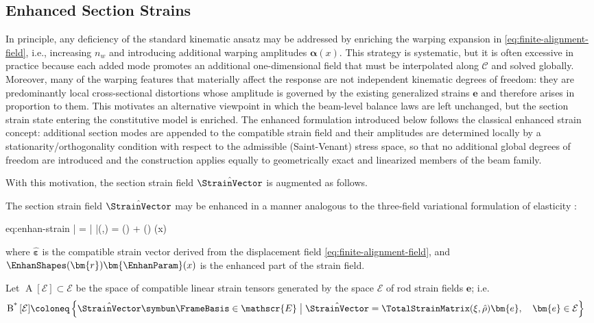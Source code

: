 
\subsection{Enhanced Section Strains}\label{sec:enhan-section}
In principle, any deficiency of the standard kinematic ansatz may be addressed by enriching the warping expansion in \eqref{eq:finite-alignment-field}, i.e., increasing $n_w$ and introducing additional warping amplitudes $\bm{\alpha}(x)$. This strategy is systematic, but it is often excessive in practice because each added mode promotes an additional one-dimensional field that must be interpolated along $\mathcal{C}$ and solved globally. 
Moreover, many of the warping features that materially affect the response are not independent kinematic degrees of freedom: they are predominantly local cross-sectional distortions whose amplitude is governed by the existing generalized strains $\bm{e}$ and therefore arises in proportion to them. 
This motivates an alternative viewpoint in which the beam-level balance laws are left unchanged, but the section strain state entering the constitutive model is enriched. The enhanced formulation introduced below follows the classical enhanced strain concept: additional section modes are appended to the compatible strain field and their amplitudes are determined locally by a stationarity/orthogonality condition with respect to the admissible (Saint-Venant) stress space, so that no additional global degrees of freedom are introduced and the construction applies equally to geometrically exact and linearized members of the beam family.

With this motivation, the section strain field $\hat{\StrainVector}$ is augmented as follows.


The section strain field \(\hat{\StrainVector}\) may be enhanced in a manner analogous to the three-field variational formulation of elasticity \citep{simo1986variational,simo1990class,simo1992geometrically}:
\begin{SaveEquation}{eq:enhan-strain}
\bar{} = \bar{\bm{\varepsilon}}\symbun\FrameBasis
\qquad{}\qquad
\bar{\StrainVector}(,) =  \hat{\StrainVector}() + \EnhanShapes() \bm{\EnhanParam}(x)
\end{SaveEquation}
where \(\hat{\bm{\varepsilon}}\) is the compatible strain vector derived from the displacement field \eqref{eq:finite-alignment-field}, and $\EnhanShapes(\bm{r}) \bm{\EnhanParam}(x)$ is the enhanced part of the strain field. 

Let $\operatorname{A}\left[\mathcal{E}\right] \subset \mathscr{E}$ be the space of compatible linear strain tensors generated by the space $\mathcal{E}$ of rod strain fields \(\bm{e}\); i.e. 
$$
\begin{aligned}
\operatorname{B^*}\left[\mathcal{E}\right]
&\coloneq \left\{
\hat{\StrainVector} \symbun \FrameBasis \in \mathscr{E} 
\bigm| 
\hat{\StrainVector}
=\TotalStrainMatrix(\xi,\hat{\rho}) \bm{e},
\quad \bm{e} \in \mathcal{E}
\right\}
\end{aligned}
$$

